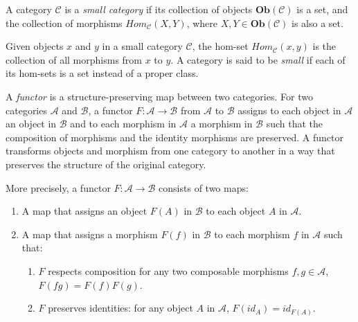 \begin{definition}
    A category $\mathcal{C}$ is a \textit{small category} if its collection of objects $\textbf{Ob}(\mathcal{C})$ is a set, and the collection of morphisms $Hom_{\mathcal{C}}(X, Y)$, where $X,Y \in \textbf{Ob}(\mathcal{C})$ is also a set.
\end{definition}

\begin{definition}
    Given objects $x$ and $y$ in a small category $\mathcal{C}$, the hom-set $Hom_{\mathcal{C}}(x,y)$  is the collection of all morphisms from $x$ to $y$.
    A category is said to be \textit{small} if each of its hom-sets is a set instead of a proper class.
\end{definition}

\begin{definition}
    A \textit{functor} is a structure-preserving map between two categories.
    For two categories $\mathcal{A}$ and $\mathcal{B}$, a functor $F: \mathcal{A} \to \mathcal{B}$ from $\mathcal{A}$ to $\mathcal{B}$ assigns to each object in $\mathcal{A}$ an object in $\mathcal{B}$ and to each morphism in $\mathcal{A}$ a morphism in $\mathcal{B}$ such that the composition of morphisms and the identity morphisms are preserved.
    A functor transforms objects and morphism from one category to another in a way that preserves the structure of the original category.

    More precisely, a functor $F: \mathcal{A} \to \mathcal{B}$ consists of two maps:
    \begin{enumerate}
        \item A map that assigns an object $F(A)$ in $\mathcal{B}$ to each object $A$ in $\mathcal{A}$.

        \item A map that assigns a morphism $F(f)$ in $\mathcal{B}$ to each morphism $f$ in $\mathcal{A}$ such that:
        \begin{enumerate}
            \item $F$ respects composition for any two composable morphisms $f,g \in \mathcal{A}$, $F(fg) = F(f) F(g)$.

            \item $F$ preserves identities: for any object $A$ in $\mathcal{A}$, $F(id_{A}) = id_{F(A)}$.
        \end{enumerate}
    \end{enumerate}
\end{definition}
    
